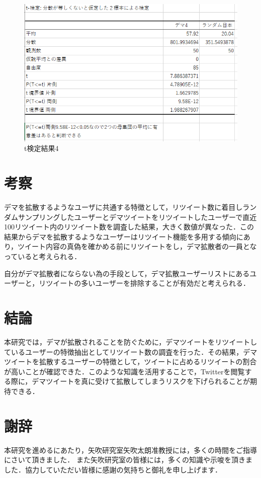 \begin{figure}[htb]
\centering
\includegraphics[width=13cm]{21.png}
\caption{t検定結果4}\label{33}
\end{figure}
\clearpage

\chapter{考察}
デマを拡散するようなユーザに共通する特徴として，リツイート数に着目しランダムサンプリングしたユーザーとデマツイートをリツイートしたユーザーで直近100リツイート内のリツイート数を調査した結果，大きく数値が異なった．この結果からデマを拡散するようなユーザーはリツイート機能を多用する傾向にあり，ツイート内容の真偽を確かめる前にリツイートをし，デマ拡散者の一員となっていると考えられる．

自分がデマ拡散者にならない為の手段として，デマ拡散ユーザーリストにあるユーザーと，リツイートの多いユーザーを排除することが有効だと考えられる．


\chapter{結論}
本研究では，デマが拡散されることを防ぐために，デマツイートをリツイートしているユーザーの特徴抽出としてリツイート数の調査を行った．その結果，デマツイートを拡散するユーザーの特徴として，ツイートに占めるリツイートの割合が高いことが確認できた．このような知識を活用することで，Twitterを閲覧する際に，デマツイートを真に受けて拡散してしまうリスクを下げられることが期待できる．




\chapter*{謝辞}


本研究を進めるにあたり，矢吹研究室矢吹太朗准教授には，多くの時間をご指導にさいて頂きました．
また矢吹研究室の皆様には，多くの知識や示唆を頂きました．協力していただい皆様に感謝の気持ちと御礼を申し上げます．



